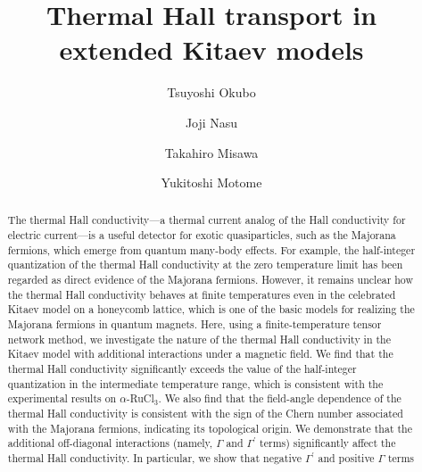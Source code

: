\documentclass[twocolumn,superscriptaddress,showpacs, longbibliography, aps, prb]{revtex4-2}
\newcommand{\orange}[1]{\textcolor{orange}{#1}}
\begin{document}
\title{Thermal Hall transport in extended Kitaev models}
\author{Tsuyoshi Okubo}
\author{Joji Nasu}
\author{Takahiro Misawa}
\author{Yukitoshi Motome}


\begin{abstract}
The thermal Hall conductivity---a thermal current analog of the Hall conductivity for electric current---is a useful detector for exotic quasiparticles, %
 such as the Majorana %
fermions, which emerge from quantum many-body effects.
For example, the half-integer quantization of the thermal Hall conductivity at the zero temperature limit
has been regarded as direct evidence of the Majorana %
fermions.
However, it %
remains unclear how the thermal Hall conductivity behaves at finite temperatures even %
in the celebrated Kitaev model on a honeycomb lattice, which is one of the basic models for realizing the Majorana %
fermions in quantum magnets.  
Here, 
using a finite-temperature tensor network method, we investigate 
the nature of the thermal Hall conductivity in the Kitaev model with additional interactions under a magnetic field.
We find that the thermal Hall conductivity significantly exceeds the value of the half-integer quantization in the intermediate temperature range, which is consistent with
the experimental results %
on $\alpha$-RuCl$_{3}$. 
We also find that the field-angle dependence of the thermal Hall conductivity is
consistent with the sign of the Chern number %
associated with the Majorana fermions,
indicating its topological origin.
We demonstrate that the additional off-diagonal interactions (namely, $\Gamma$ and $\Gamma^{\prime}$ terms) %
significantly affect the thermal Hall conductivity. In particular, we show that negative $\Gamma^{\prime}$ and positive $\Gamma$ terms %

\end{abstract}
\end{document}
